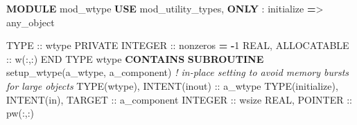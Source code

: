 \documentclass[
]{article}
\newenvironment{Shaded}{}{}
\newcommand{\CommentTok}[1]{\textcolor[rgb]{0.38,0.63,0.69}{\textit{#1}}}
\newcommand{\DataTypeTok}[1]{\textcolor[rgb]{0.56,0.13,0.00}{#1}}
\newcommand{\DecValTok}[1]{\textcolor[rgb]{0.25,0.63,0.44}{#1}}
\newcommand{\KeywordTok}[1]{\textcolor[rgb]{0.00,0.44,0.13}{\textbf{#1}}}
\newcommand{\NormalTok}[1]{#1}
\newcommand{\OperatorTok}[1]{\textcolor[rgb]{0.40,0.40,0.40}{#1}}
\begin{document}
\begin{Shaded}
\begin{Highlighting}[]
\KeywordTok{MODULE}\NormalTok{ mod\_wtype}
   \KeywordTok{USE}\NormalTok{ mod\_utility\_types, }\KeywordTok{ONLY}\NormalTok{ : initialize }\KeywordTok{=}\OperatorTok{\textgreater{}}\NormalTok{ any\_object}

   \DataTypeTok{TYPE} \DataTypeTok{::}\NormalTok{ wtype}
      \DataTypeTok{PRIVATE}
      \DataTypeTok{INTEGER} \DataTypeTok{::}\NormalTok{ nonzeros }\KeywordTok{=} \KeywordTok{{-}}\DecValTok{1}
      \DataTypeTok{REAL}\NormalTok{, }\DataTypeTok{ALLOCATABLE} \DataTypeTok{::}\NormalTok{ w(:,:)}
   \DataTypeTok{END TYPE}\NormalTok{ wtype}
\KeywordTok{CONTAINS}
   \KeywordTok{SUBROUTINE}\NormalTok{ setup\_wtype(a\_wtype, a\_component)}
      \CommentTok{! in{-}place setting to avoid memory bursts for large objects}
      \DataTypeTok{TYPE(wtype)}\NormalTok{, }\DataTypeTok{INTENT(inout)} \DataTypeTok{::}\NormalTok{ a\_wtype}
      \DataTypeTok{TYPE(initialize)}\NormalTok{, }\DataTypeTok{INTENT(in)}\NormalTok{, }\DataTypeTok{TARGET} \DataTypeTok{::}\NormalTok{ a\_component}
      \DataTypeTok{INTEGER} \DataTypeTok{::}\NormalTok{ wsize}
      \DataTypeTok{REAL}\NormalTok{, }\DataTypeTok{POINTER} \DataTypeTok{::}\NormalTok{ pw(:,:)}


\end{Highlighting}
\end{Shaded}
\end{document}
